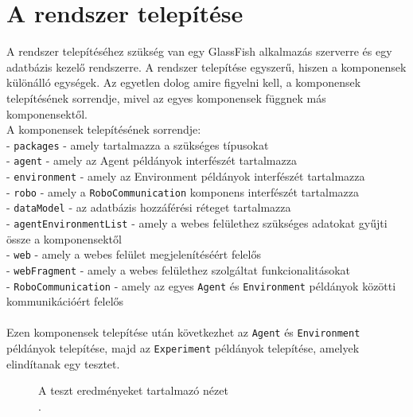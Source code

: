 \section{A rendszer telepítése}\label{sec:Telepites}
A rendszer telepítéséhez szükség van egy GlassFish alkalmazás szerverre és egy adatbázis kezelő rendszerre. A rendszer telepítése egyszerű, hiszen a komponensek különálló egységek. Az egyetlen dolog amire figyelni kell, a komponensek telepítésének sorrendje, mivel az egyes komponensek függnek más komponensektől.
\\
A komponensek telepítésének sorrendje:
\\
- \texttt{packages} - amely tartalmazza a szükséges típusokat
\\
- \texttt{agent} - amely az Agent példányok interfészét tartalmazza
\\
- \texttt{environment} - amely az Environment példányok interfészét tartalmazza
\\
- \texttt{robo} - amely a \texttt{RoboCommunication} komponens interfészét tartalmazza
\\
- \texttt{dataModel} - az adatbázis hozzáférési réteget tartalmazza
\\
- \texttt{agentEnvironmentList} - amely a webes felülethez szükséges adatokat gyűjti össze a komponensektől
\\
- \texttt{web} - amely a webes felület megjelenítéséért felelős
\\
- \texttt{webFragment} - amely a webes felülethez szolgáltat funkcionalitásokat
\\
- \texttt{RoboCommunication} - amely az egyes \texttt{Agent} és \texttt{Environment} példányok közötti kommunikációért felelős
\\
\\
Ezen komponensek telepítése után következhet az \texttt{Agent} és \texttt{Environment} példányok telepítése, majd az \texttt{Experiment} példányok telepítése, amelyek elindítanak egy tesztet.

\begin{figure}[h!]
  \centering
  \caption[A teszt eredményeket tartalmazó nézet]%
  {A teszt eredményeket tartalmazó nézet\\
  {\white .}\hfill\url{}}
  \label{fig:webResults}
\end{figure}




